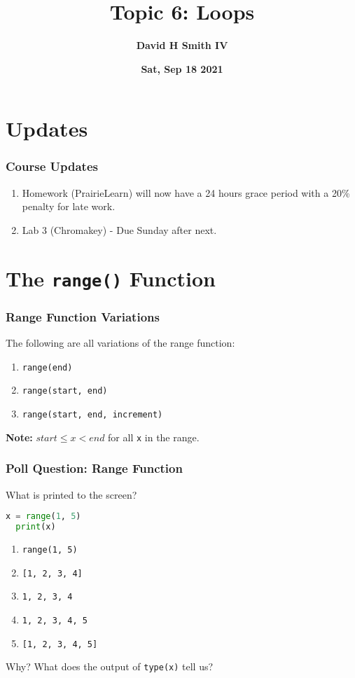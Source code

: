 \documentclass{beamer}
\title{\textbf{Topic 6: Loops}}
\author{\textbf{David H Smith IV}}
\institute[\textbf{UIUC}]{\textbf{University of Illinois Urbana-Champaign}}
\date{\textbf{Sat, Sep 18 2021}}
\begin{document}
\frame{\titlepage}

\section{Updates}

%
%
\begin{frame}[fragile]
  \frametitle{Course Updates}
  \begin{enumerate}[A]
    \item Homework (PrairieLearn) will now have a 24 hours grace period with a 20\% penalty for late work.
    \item Lab 3 (Chromakey) - Due Sunday after next.
  \end{enumerate}
\end{frame}




\section{The \lstinline|range()| Function}

%
%
\begin{frame}[fragile]
  \frametitle{Range Function Variations}
  The following are all variations of the range function:
  \begin{enumerate}[A]
    \item \lstinline|range(end)|
    \item \lstinline|range(start, end)|
    \item \lstinline|range(start, end, increment)|
  \end{enumerate}
  \vfill
  \textbf{Note: } $start \leq x < end$ for all \lstinline|x| in the range.
\end{frame}

%
%
\begin{frame}[fragile]
  \frametitle{Poll Question: Range Function}
  What is printed to the screen?
  \begin{lstlisting}[language=Python, autogobble]
  x = range(1, 5)
  print(x)
  \end{lstlisting}
  \vfill
  \begin{enumerate}[A]
    \item \lstinline|range(1, 5)|
    \item \lstinline|[1, 2, 3, 4]|
    \item \lstinline|1, 2, 3, 4|
    \item \lstinline|1, 2, 3, 4, 5|
    \item \lstinline|[1, 2, 3, 4, 5]|
  \end{enumerate}
  \vfill \pause
  Why? What does the output of \lstinline|type(x)| tell us?
\end{frame}
\end{document}
